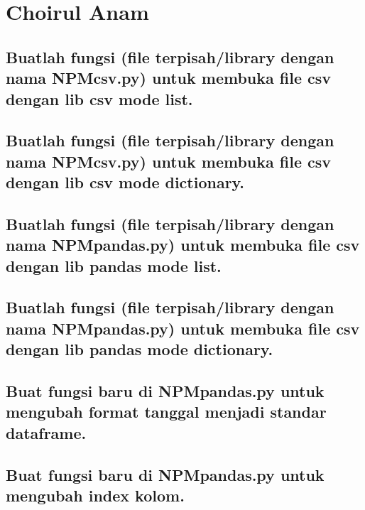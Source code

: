 \section{Choirul Anam}
\subsection{Buatlah  fungsi  (file  terpisah/library  dengan  nama  NPMcsv.py)  untuk  membuka file csv dengan lib csv mode list.}


\subsection{Buatlah  fungsi  (file  terpisah/library  dengan  nama  NPMcsv.py)  untuk  membuka file csv dengan lib csv mode dictionary.}


\subsection{Buatlah fungsi (file terpisah/library dengan nama NPMpandas.py) untuk membuka file csv dengan lib pandas mode list.}


\subsection{Buatlah fungsi (file terpisah/library dengan nama NPMpandas.py) untuk membuka file csv dengan lib pandas mode dictionary.}


\subsection{Buat fungsi baru di NPMpandas.py untuk mengubah format tanggal menjadi standar dataframe.}


\subsection{Buat fungsi baru di NPMpandas.py untuk mengubah index kolom.}


